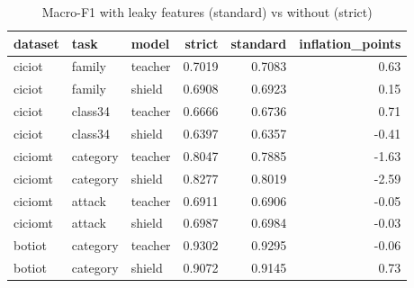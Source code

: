 \begin{table}
\caption{Macro-F1 with leaky features (standard) vs without (strict)}
\begin{tabular}{lllrrr}
\toprule
dataset & task & model & strict & standard & inflation_points \\
\midrule
ciciot & family & teacher & 0.7019 & 0.7083 & 0.63 \\
ciciot & family & shield & 0.6908 & 0.6923 & 0.15 \\
ciciot & class34 & teacher & 0.6666 & 0.6736 & 0.71 \\
ciciot & class34 & shield & 0.6397 & 0.6357 & -0.41 \\
ciciomt & category & teacher & 0.8047 & 0.7885 & -1.63 \\
ciciomt & category & shield & 0.8277 & 0.8019 & -2.59 \\
ciciomt & attack & teacher & 0.6911 & 0.6906 & -0.05 \\
ciciomt & attack & shield & 0.6987 & 0.6984 & -0.03 \\
botiot & category & teacher & 0.9302 & 0.9295 & -0.06 \\
botiot & category & shield & 0.9072 & 0.9145 & 0.73 \\
\bottomrule
\end{tabular}
\end{table}
